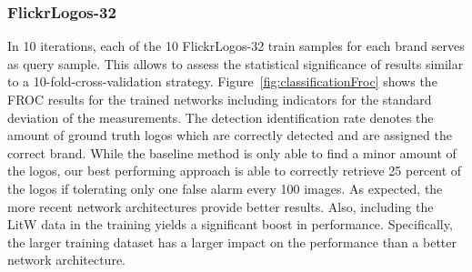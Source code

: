 \documentclass[a4paper,twoside]{article}
\begin{document}
\subsubsection*{FlickrLogos-32}
\vspace*{-2.5mm}
In 10 iterations, each of the 10 FlickrLogos-32 train samples for each brand serves as query sample. This allows to assess the statistical significance of results similar to a 10-fold-cross-validation strategy. Figure~\ref{fig:classificationFroc} shows the FROC results for the trained networks including indicators for the standard deviation of the measurements. The detection identification rate denotes the amount of ground truth logos which are correctly detected and are assigned the correct brand.
While the baseline method is only able to find a minor amount of the logos, our best performing approach is able to correctly retrieve 25 percent of the logos if tolerating only one false alarm every 100 images.
As expected, the more recent network architectures provide better results. Also, including the \ac{LitW} data in the training yields a significant boost in performance. Specifically, the larger training dataset has a larger impact on the performance than a better network architecture. 
%
\end{document}
